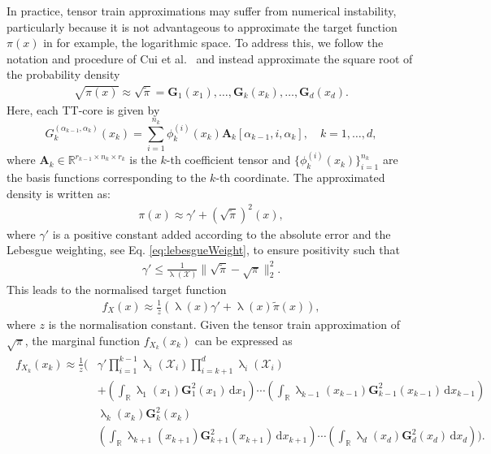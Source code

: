 In practice, tensor train approximations may suffer from numerical instability, particularly because it is not advantageous to approximate the target function $\pi(x)$ in for example, the logarithmic space. 
To address this, we follow the notation and procedure of Cui et al.~\cite{cui2022deep} and instead approximate the square root of the probability density
\begin{align}
	\sqrt{\pi(x)} \approx \sqrt{\tilde{\pi}} = \bm{G}_1(x_1), \dots, \bm{G}_k(x_k), \dots, \bm{G}_d(x_d).
\end{align}
Here, each TT-core is given by
\begin{equation}
	G^{(\alpha_{k-1},\alpha_k)}_k(x_k) = \sum_{i=1}^{n_k} \phi^{(i)}_k(x_k) \bm{A}_k[\alpha_{k-1}, i, \alpha_k], \quad k = 1, \dots, d,
\end{equation}
where $\bm{A}_k \in \mathbb{R}^{r_{k-1} \times n_k \times r_k}$ is the $k$-th coefficient tensor and $\{\phi^{(i)}_k(x_k)\}_{i=1}^{n_k}$ are the basis functions corresponding to the $k$-th coordinate.
The approximated density is written as:
\begin{align}
	\pi(x) \approx \gamma' + (\sqrt{\tilde{\pi}})^2(x),
\end{align}
where $\gamma'$ is a positive constant added according to the absolute error and the Lebesgue weighting, see Eq. \ref{eq:lebesgueWeight}, to ensure positivity such that
\begin{align}
	\gamma' \leq \frac{1}{\uplambda(\mathcal{X})} \lVert \sqrt{\tilde{\pi}} - \sqrt{\pi} \rVert_2^2.
\end{align}
This leads to the normalised target function
\begin{align}
	f_X(x)  \approx \frac{1}{z} \left( \uplambda(x) \gamma'  + \uplambda(x) \tilde{\pi}(x) \right),
\end{align}
where $z$ is the normalisation constant.
Given the tensor train approximation of $\sqrt{\pi}$, the marginal function $f_{X_k}(x_k)$ can be expressed as
\begin{align}
	\begin{split}
		f_{X_k}(x_k)  \approx \frac{1}{z} \Bigg(&\gamma' \prod_{i=1}^{k-1} \uplambda_i(\mathcal{X}_i) \prod_{i=k+1}^{d} \uplambda_i(\mathcal{X}_i) \\
		&+ \left( \int_{\mathbb{R}} \uplambda_1(x_1) \bm{G}_1^2(x_1)  \, \mathrm{d}x_1 \right) \cdots 
		\left( \int_{\mathbb{R}} \uplambda_{k-1}(x_{k-1}) \bm{G}_{k-1}^2(x_{k-1}) \, \mathrm{d}x_{k-1} \right) \\
		& \uplambda_k(x_k) \bm{G}_k^2(x_k)  \\
		&\left( \int_{\mathbb{R}} \uplambda_{k+1}(x_{k+1}) \bm{G}_{k+1}^2(x_{k+1})  \, \mathrm{d}x_{k+1} \right) \cdots 
		\left( \int_{\mathbb{R}} \uplambda_d(x_d) \bm{G}_d^2(x_d)  \, \mathrm{d}x_d \right) \Bigg).
	\end{split}
\end{align}
